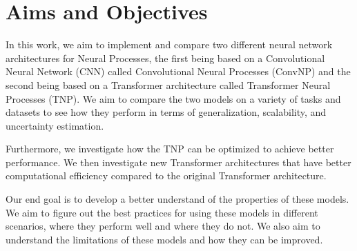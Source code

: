 \documentclass[../../main.tex]{subfiles}
\begin{document}
\section{Aims and Objectives}

In this work, we aim to implement and compare two different neural network architectures for Neural Processes, the first being based on a Convolutional Neural Network (CNN) called Convolutional Neural Processes (ConvNP) and the second being based on a Transformer architecture called Transformer Neural Processes (TNP). We aim to compare the two models on a variety of tasks and datasets to see how they perform in terms of generalization, scalability, and uncertainty estimation. 

Furthermore, we investigate how the TNP can be optimized to achieve better performance. We then investigate new Transformer architectures that have better computational efficiency compared to the original Transformer architecture. 

Our end goal is to develop a better understand of the properties of these models. We aim to figure out the best practices for using these models in different scenarios, where they perform well and where they do not. We also aim to understand the limitations of these models and how they can be improved.





\ifSubfilesClassLoaded{%
    \printbibliography{}
}{} 
\end{document}
